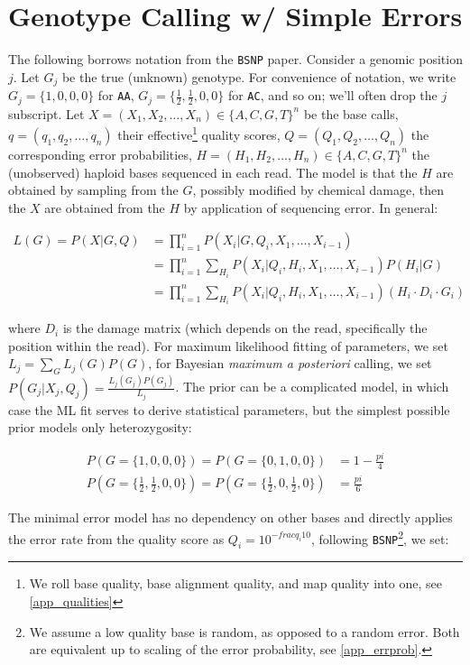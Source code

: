 \documentclass{article}
\begin{document}
\section{Genotype Calling w/ Simple Errors}

The following borrows notation from the \texttt{BSNP} paper.  Consider a
genomic position $j$.  Let $G_j$ be the true (unknown) genotype.  For
convenience of notation, we write $G_j=\{1,0,0,0\}$ for \texttt{AA},
$G_j=\{\frac{1}{2},\frac{1}{2},0,0\}$ for \texttt{AC}, and so on; we'll
often drop the $j$ subscript.  Let $X=(X_1, X_2, \ldots, X_n) \in
\{A,C,G,T\}^n$ be the base calls, $q=(q_1, q_2, \ldots, q_n)$ their
effective\footnote{We roll base quality, base alignment quality, and map
quality into one, see \ref{app_qualities}} quality scores, $Q=(Q_1, Q_2,
\ldots, Q_n)$ the corresponding error probabilities, $H=(H_1, H_2,
\ldots, H_n) \in \{A,C,G,T\}^n$ the (unobserved) haploid bases
sequenced in each read.  The model is that the $H$ are obtained by
sampling from the $G$, possibly modified by chemical damage, then the
$X$ are obtained from the $H$ by application of sequencing error.  In
general:

\begin{align*}
L(G) = P(X|G,Q) &= \prod_{i=1}^n P(X_i|G,Q_i,X_1,\ldots,X_{i-1}) \\
    &= \prod_{i=1}^n \sum_{H_i} P(X_i|Q_i,H_i,X_1,\ldots,X_{i-1}) P(H_i|G) \\
    &= \prod_{i=1}^n \sum_{H_i} P(X_i|Q_i,H_i,X_1,\ldots,X_{i-1}) (H_i \cdot D_i \cdot G_i)
\end{align*}

where $D_i$ is the damage matrix (which depends on the read, specifically the position within the read).
For maximum likelihood fitting of parameters, we set $L_j = \sum_G L_j(G) P(G)$, for Bayesian \emph{maximum a posteriori} calling,
we set $P(G_j|X_j,Q_j) = \frac{L_j(G_j) P(G_j)}{L_j}$.  The prior can be a complicated model, in which case the ML fit serves to
derive statistical parameters, but the simplest possible prior models only heterozygosity:

\begin{align*}
P(G=\{1,0,0,0\}) = P(G=\{0,1,0,0\}) &= 1 - \frac{pi}{4} \\
P(G=\{\frac{1}{2},\frac{1}{2},0,0\}) = P(G=\{\frac{1}{2},0,\frac{1}{2},0\}) &= \frac{pi}{6}
\end{align*}

The minimal error model has no dependency on other bases and directly applies the error rate from the quality score as $Q_i =
10^{-frac{q_i}{10}}$, following \texttt{BSNP}\footnote{We assume a low quality base is random, as opposed to a random error.  Both
are equivalent up to scaling of the error probability, see \ref{app_errprob}.}, we set:
\end{document}
